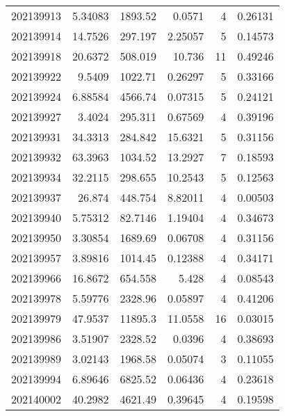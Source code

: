 \begin{tabular}{rrrrrr}
 202139913 &          5.34083 &     1893.52   &            0.0571  &           4 & 0.26131 \\
 202139914 &         14.7526  &      297.197  &            2.25057 &           5 & 0.14573 \\
 202139918 &         20.6372  &      508.019  &           10.736   &          11 & 0.49246 \\
 202139922 &          9.5409  &     1022.71   &            0.26297 &           5 & 0.33166 \\
 202139924 &          6.88584 &     4566.74   &            0.07315 &           5 & 0.24121 \\
 202139927 &          3.4024  &      295.311  &            0.67569 &           4 & 0.39196 \\
 202139931 &         34.3313  &      284.842  &           15.6321  &           5 & 0.31156 \\
 202139932 &         63.3963  &     1034.52   &           13.2927  &           7 & 0.18593 \\
 202139934 &         32.2115  &      298.655  &           10.2543  &           5 & 0.12563 \\
 202139937 &         26.874   &      448.754  &            8.82011 &           4 & 0.00503 \\
 202139940 &          5.75312 &       82.7146 &            1.19404 &           4 & 0.34673 \\
 202139950 &          3.30854 &     1689.69   &            0.06708 &           4 & 0.31156 \\
 202139957 &          3.89816 &     1014.45   &            0.12388 &           4 & 0.34171 \\
 202139966 &         16.8672  &      654.558  &            5.428   &           4 & 0.08543 \\
 202139978 &          5.59776 &     2328.96   &            0.05897 &           4 & 0.41206 \\
 202139979 &         47.9537  &    11895.3    &           11.0558  &          16 & 0.03015 \\
 202139986 &          3.51907 &     2328.52   &            0.0396  &           4 & 0.38693 \\
 202139989 &          3.02143 &     1968.58   &            0.05074 &           3 & 0.11055 \\
 202139994 &          6.89646 &     6825.52   &            0.06436 &           4 & 0.23618 \\
 202140002 &         40.2982  &     4621.49   &            0.39645 &           4 & 0.19598 \\

\end{tabular}
